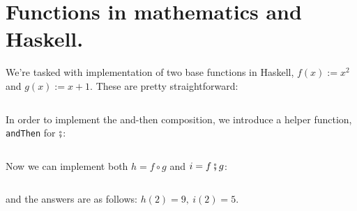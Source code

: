 \section{ Functions in mathematics and Haskell. } 
We're tasked with implementation of two base functions in Haskell, $f(x) := x^2$ and $g(x) := x + 1.$
These are pretty straightforward:
\inputminted[firstline=7,
             lastline=11,
             fontsize=\footnotesize, tabsize=4]{haskell}{ps1.hs}
In order to implement the and-then composition, we introduce a helper function, {\tt andThen} for $\fatsemi$:
\inputminted[firstline=13,
             lastline=14,
             fontsize=\footnotesize, tabsize=4]{haskell}{ps1.hs}
Now we can implement both $h = f \circ g$ and $i = f \fatsemi g$:
\inputminted[firstline=16,
             lastline=20,
             fontsize=\footnotesize, tabsize=4]{haskell}{ps1.hs}
and the answers are as follows: $h(2) = 9,\ i(2) = 5.$